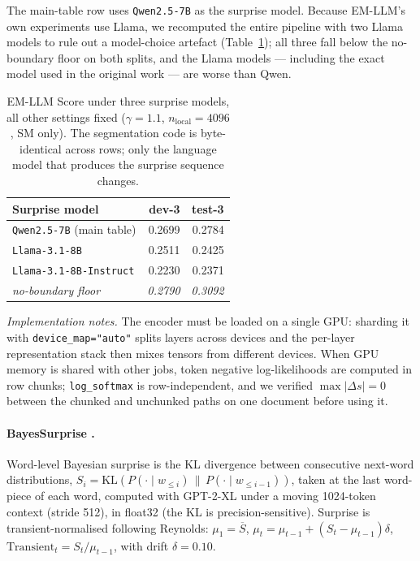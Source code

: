 The main-table row uses \texttt{Qwen2.5-7B} as the surprise model. Because
EM-LLM's own experiments use Llama, we recomputed the entire pipeline with two
Llama models to rule out a model-choice artefact
(Table~\ref{tab:app-emllm-lm}); all three fall below the no-boundary floor on
both splits, and the Llama models --- including the exact model used in the
original work --- are worse than Qwen.

\begin{table}[t]
\centering\small
\begin{tabular}{@{}lrr@{}}
\toprule
Surprise model & dev-3 & test-3 \\
\midrule
\texttt{Qwen2.5-7B} (main table)     & 0.2699 & 0.2784 \\
\texttt{Llama-3.1-8B}                & 0.2511 & 0.2425 \\
\texttt{Llama-3.1-8B-Instruct}       & 0.2230 & 0.2371 \\
\midrule
\emph{no-boundary floor}             & \emph{0.2790} & \emph{0.3092} \\
\bottomrule
\end{tabular}
\caption{EM-LLM Score under three surprise models, all other settings fixed
($\gamma{=}1.1$, $n_{\text{local}}{=}4096$, SM only). The segmentation code is
byte-identical across rows; only the language model that produces the surprise
sequence changes.}
\label{tab:app-emllm-lm}
\end{table}

\emph{Implementation notes.} The encoder must be loaded on a single GPU:
sharding it with \texttt{device\_map="auto"} splits layers across devices and
the per-layer representation stack then mixes tensors from different devices.
When GPU memory is shared with other jobs, token negative log-likelihoods are
computed in row chunks; \texttt{log\_softmax} is row-independent, and we
verified $\max|\Delta s| = 0$ between the chunked and unchunked paths on one
document before using it.

\paragraph{BayesSurprise \citep{kumar2023bayesian}.}
Word-level Bayesian surprise is the KL divergence between consecutive
next-word distributions, $S_i = \mathrm{KL}(P(\cdot\mid w_{\le i}) \,\|\,
P(\cdot\mid w_{\le i-1}))$, taken at the last word-piece of each word, computed
with GPT-2-XL under a moving 1024-token context (stride 512), in float32
(the KL is precision-sensitive). Surprise is transient-normalised following
Reynolds: $\mu_1 = \overline{S}$, $\mu_t = \mu_{t-1} + (S_t-\mu_{t-1})\delta$,
$\mathrm{Transient}_t = S_t/\mu_{t-1}$, with drift $\delta = 0.10$.

